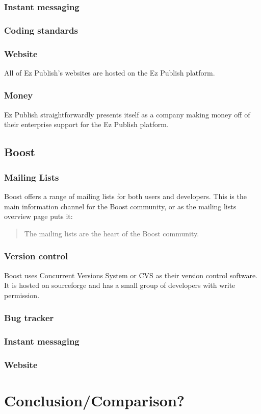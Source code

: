 \documentclass{report} %
\begin{document}
\subsubsection{Instant messaging} %
\subsubsection{Coding standards}
\subsubsection{Website}
All of Ez Publish's websites are hosted on the Ez Publish platform.
\subsubsection{Money}
Ez Publish straightforwardly presents itself as a company making money off of their enterprise support for the Ez Publish platform.

\subsection{Boost}
\subsubsection{Mailing Lists}
Boost offers a range of mailing lists\cite{boostmaillists} for both users and developers. This is the main information channel for the Boost community, or as the mailing lists overview page\cite{boostmaillists} puts it:
\begin{quote}
The mailing lists are the heart of the Boost community.
\end{quote}

\subsubsection{Version control}
Boost uses Concurrent Versions System or CVS as their version control software. It is hosted on sourceforge and has a small group of developers with write permission.

\subsubsection{Bug tracker}
\subsubsection{Instant messaging}
\subsubsection{Website}

\section{Conclusion/Comparison?}


\end{document}
